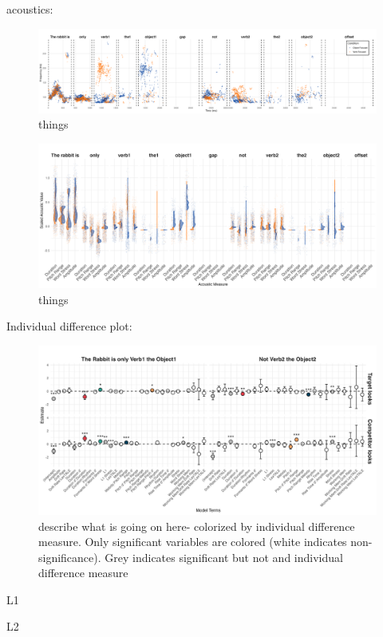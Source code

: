 acoustics:
\begin{figure}[H]  %
    \centering
    \includegraphics[width=\textwidth,height=\textheight,keepaspectratio]{viz/accoustic.png}
    \caption{things}
    \label{fig:acoustic}
\end{figure}

\begin{figure}[H]  %
    \centering
    \includegraphics[width=\textwidth,height=\textheight,keepaspectratio]{viz/acoustic_faceted.png}
    \caption{things}
    \label{fig:acoustic_faceted}
\end{figure}



Individual difference plot:


\begin{figure}[H]  %
    \centering
    \includegraphics[width=\textwidth,height=\textheight,keepaspectratio]{viz/id_gam_mod_out.png}
    \caption{describe what is going on here- colorized by individual difference measure. Only significant variables are colored (white indicates non-significance). Grey indicates significant but not and individual difference measure}
    \label{fig:id_gam_mod_out}
\end{figure}

L1 

L2


